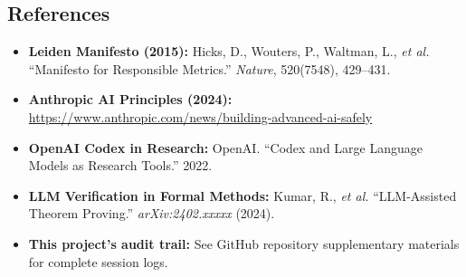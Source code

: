 \documentclass[11pt,a4paper]{article}
\theoremstyle{plain}
\theoremstyle{definition}
\theoremstyle{remark}
\begin{document}
\subsection*{References}

\begin{itemize}[leftmargin=2em]
  \item \textbf{Leiden Manifesto (2015):} Hicks, D., Wouters, P., Waltman, L., \emph{et al.} ``Manifesto for Responsible Metrics.'' \emph{Nature}, 520(7548), 429--431.
  \item \textbf{Anthropic AI Principles (2024):} \url{https://www.anthropic.com/news/building-advanced-ai-safely}
  \item \textbf{OpenAI Codex in Research:} OpenAI. ``Codex and Large Language Models as Research Tools.'' 2022.
  \item \textbf{LLM Verification in Formal Methods:} Kumar, R., \emph{et al.} ``LLM-Assisted Theorem Proving.'' \emph{arXiv:2402.xxxxx} (2024).
  \item \textbf{This project's audit trail:} See GitHub repository supplementary materials for complete session logs.
\end{itemize}
\end{document}
